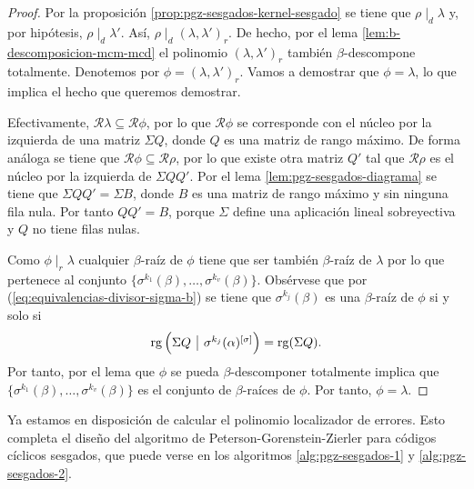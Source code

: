 \begin{proof}
  Por la proposición \ref{prop:pgz-sesgados-kernel-sesgado} se tiene que \(\rho \mid_d \lambda\) y, por hipótesis, \(\rho \mid_d \lambda'\).
  Así, \(\rho \mid_d (\lambda, \lambda')_{r}\).
  De hecho, por el lema \ref{lem:b-descomposicion-mcm-mcd} el polinomio \((\lambda, \lambda')_{r}\) también \(\beta\)-descompone totalmente.
  Denotemos por \(\phi = (\lambda, \lambda')_{r}\).
  Vamos a demostrar que \(\phi = \lambda\), lo que implica el hecho que queremos demostrar.

  Efectivamente, \(\mathcal R \lambda \subseteq \mathcal R\phi\), por lo que \(\mathcal R\phi\) se corresponde con el núcleo por la izquierda de una matriz \(\Sigma Q\), donde \(Q\) es una matriz de rango máximo.
  De forma análoga se tiene que \(\mathcal R\phi \subseteq \mathcal R\rho\), por lo que existe otra matriz \(Q'\) tal que \(\mathcal R\rho\) es el núcleo por la izquierda de \(\Sigma QQ'\).
  Por el lema \ref{lem:pgz-sesgados-diagrama} se tiene que \(\Sigma QQ' = \Sigma B\), donde \(B\) es una matriz de rango máximo y sin ninguna fila nula.
  Por tanto \(QQ' = B\), porque \(\Sigma\) define una aplicación lineal sobreyectiva y \(Q\) no tiene filas nulas.

  Como \(\phi \mid_r \lambda\) cualquier \(\beta\)-raíz de \(\phi\) tiene que ser también \(\beta\)-raíz de \(\lambda\) por lo que pertenece al conjunto \(\{\sigma^{k_1}(\beta), \dots, \sigma^{k_v}(\beta)\}\).
  Obsérvese que por (\ref{eq:equivalencias-divisor-sigma-b}) se tiene que \(\sigma^{k_j}(\beta)\) es una \(\beta\)-raíz de \(\phi\) si y solo si
  \[
    \rank\left( \begin{array}{@{}c|c@{}}
      \Sigma Q & \sigma^{k_j}(\alpha)^{[\sigma]}
    \end{array}\right) = \rank(\Sigma Q).
  \]
  Por tanto, por el lema \parencite[Lema 2.3]{gomez-torrecillas_petersongorensteinzierler_2018} que \(\phi\) se pueda \(\beta\)-descomponer totalmente implica que \(\{\sigma^{k_1}(\beta), \dots, \sigma^{k_v}(\beta)\}\) es el conjunto de \(\beta\)-raíces de \(\phi\).
  Por tanto, \(\phi = \lambda\).
\end{proof}

Ya estamos en disposición de calcular el polinomio localizador de errores.
Esto completa el diseño del algoritmo de Peterson-Gorenstein-Zierler para códigos cíclicos sesgados, que puede verse en los algoritmos \ref{alg:pgz-sesgados-1} y \ref{alg:pgz-sesgados-2}.

